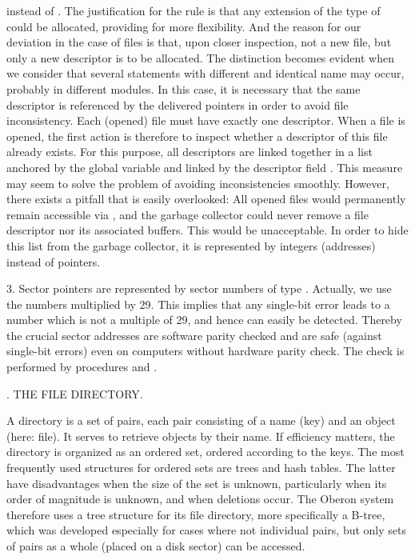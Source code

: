 \noindent instead of . The justification for the rule is that any extension of the type of  could be allocated, providing for more flexibility. And the reason for our deviation in the case of files is that, upon closer inspection, not a new file, but only a new descriptor is to be allocated. The distinction becomes evident when we consider that several statements  with different  and identical name may occur, probably in different modules. In this case, it is necessary that the same descriptor is referenced by the delivered pointers in order to avoid file inconsistency. Each (opened) file must have exactly one descriptor. When a file is opened, the first action is therefore to inspect whether a descriptor of this file already exists. For this purpose, all descriptors are linked together in a list anchored by the global variable  and linked by the descriptor field . This measure may seem to solve the problem of avoiding inconsistencies smoothly. However, there exists a pitfall that is easily overlooked: All opened files would permanently remain accessible via , and the garbage collector could never remove a file descriptor nor its associated buffers. This would be unacceptable. In order to hide this list from the garbage collector, it is represented by integers (addresses) instead of pointers.

3. Sector pointers are represented by sector numbers of type . Actually, we use the numbers multiplied by 29. This implies that any single-bit error leads to a number which is not a multiple of 29, and hence can easily be detected. Thereby the crucial sector addresses are software parity checked and are safe (against single-bit errors) even on computers without hardware parity check. The check is performed by procedures  and .

. THE FILE DIRECTORY.

A directory is a set of pairs, each pair consisting of a name (key) and an object (here: file). It serves to retrieve objects by their name. If efficiency matters, the directory is organized as an ordered set, ordered according to the keys. The most frequently used structures for ordered sets are trees and hash tables. The latter have disadvantages when the size of the set is unknown, particularly when its order of magnitude is unknown, and when deletions occur. The Oberon system therefore uses a tree structure for its file directory, more specifically a B-tree, which was developed especially for cases where not individual pairs, but only sets of pairs as a whole (placed on a disk sector) can be accessed.

